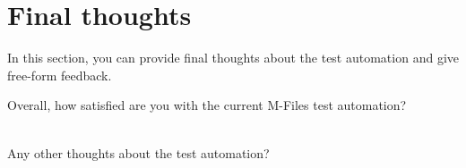 \section*{Final thoughts}
In this section, you can provide final thoughts about the test automation and give free-form feedback.

\begin{question}[resume]
	\item Overall, how satisfied are you with the current M-Files test automation?\surveyasterix\redcross\\\\
	\huge{}    \normalsize
	\item Any other thoughts about the test automation?\greencheckmark\\\\
	\longtextfield
\end{question}